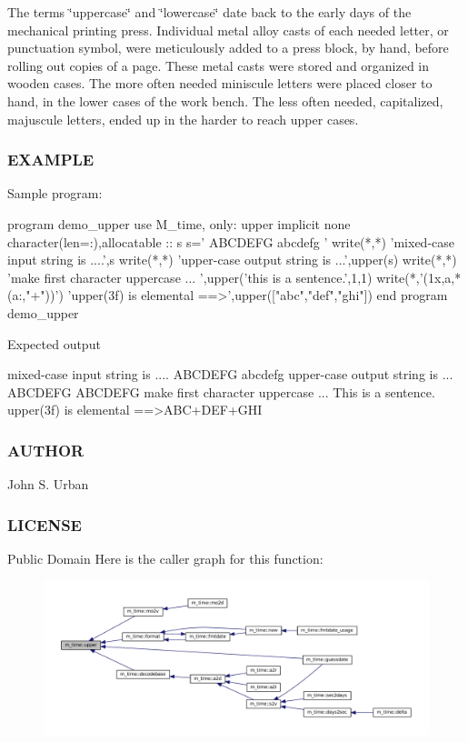 The terms \char`\"{}uppercase\char`\"{} and \char`\"{}lowercase\char`\"{} date back to the early days of the mechanical printing press. Individual metal alloy casts of each needed letter, or punctuation symbol, were meticulously added to a press block, by hand, before rolling out copies of a page. These metal casts were stored and organized in wooden cases. The more often needed miniscule letters were placed closer to hand, in the lower cases of the work bench. The less often needed, capitalized, majuscule letters, ended up in the harder to reach upper cases.

\subsubsection*{E\+X\+A\+M\+P\+LE}

\begin{DoxyVerb}Sample program:

 program demo_upper
 use M_time, only: upper
 implicit none
 character(len=:),allocatable  :: s
    s=' ABCDEFG abcdefg '
    write(*,*) 'mixed-case input string is ....',s
    write(*,*) 'upper-case output string is ...',upper(s)
    write(*,*) 'make first character uppercase  ... ',upper('this is a sentence.',1,1)
    write(*,'(1x,a,*(a:,"+"))') 'upper(3f) is elemental ==>',upper(["abc","def","ghi"])
 end program demo_upper

Expected output

 mixed-case input string is .... ABCDEFG abcdefg
 upper-case output string is ... ABCDEFG ABCDEFG
 make first character uppercase  ... This is a sentence.
 upper(3f) is elemental ==>ABC+DEF+GHI
\end{DoxyVerb}
 \subsubsection*{A\+U\+T\+H\+OR}

John S. Urban \subsubsection*{L\+I\+C\+E\+N\+SE}

Public Domain Here is the caller graph for this function\+:\nopagebreak
\begin{figure}[H]
\begin{center}
\leavevmode
\includegraphics[width=350pt]{namespacem__time_af7c0157f921a2716ede225374095c6f2_icgraph}
\end{center}
\end{figure}
\mbox{\label{namespacem__time_a6f28cf00e4998bb50bb503f5e4bd3f77}} 
